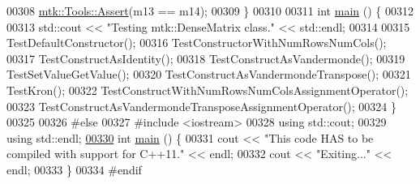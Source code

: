 \begin{DoxyCode}
00308   \hyperlink{classmtk_1_1Tools_aa311fada9255627d06c56b1e4fedce9e}{mtk::Tools::Assert}(m13 == m14);
00309 \}
00310 
00311 \textcolor{keywordtype}{int} \hyperlink{mtk__dense__matrix__test_8cc_ae66f6b31b5ad750f1fe042a706a4e3d4}{main} () \{
00312 
00313   std::cout << \textcolor{stringliteral}{"Testing mtk::DenseMatrix class."} << std::endl;
00314 
00315   TestDefaultConstructor();
00316   TestConstructorWithNumRowsNumCols();
00317   TestConstructAsIdentity();
00318   TestConstructAsVandermonde();
00319   TestSetValueGetValue();
00320   TestConstructAsVandermondeTranspose();
00321   TestKron();
00322   TestConstructWithNumRowsNumColsAssignmentOperator();
00323   TestConstructAsVandermondeTransposeAssignmentOperator();
00324 \}
00325 
00326 \textcolor{preprocessor}{#else}
00327 \textcolor{preprocessor}{#include <iostream>}
00328 \textcolor{keyword}{using} std::cout;
00329 \textcolor{keyword}{using} std::endl;
\hypertarget{mtk__dense__matrix__test_8cc_source_l00330}{}\hyperlink{mtk__dense__matrix__test_8cc_ae66f6b31b5ad750f1fe042a706a4e3d4}{00330} \textcolor{keywordtype}{int} \hyperlink{mtk__dense__matrix__test_8cc_ae66f6b31b5ad750f1fe042a706a4e3d4}{main} () \{
00331   cout << \textcolor{stringliteral}{"This code HAS to be compiled with support for C++11."} << endl;
00332   cout << \textcolor{stringliteral}{"Exiting..."} << endl;
00333 \}
00334 \textcolor{preprocessor}{#endif}
\end{DoxyCode}

